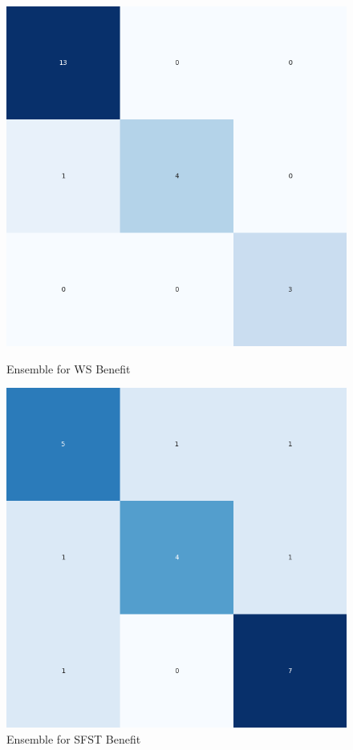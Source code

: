 \begin{figure}[H]
    \centering
    \begin{minipage}[b]{0.45\textwidth}
        \includegraphics[width=\textwidth]{./class_specificxtra_section/ensemble_plots/ensemble_confusion_matrix_WS_Benefit.png}
        \caption{Ensemble for WS Benefit}
        \label{fig_class:specxtra_ensemble_ws_benefit}
    \end{minipage}
    \hfill
    \begin{minipage}[b]{0.45\textwidth}
        \includegraphics[width=\textwidth]{./class_specificxtra_section/ensemble_plots/ensemble_confusion_matrix_SFST_Benefit.png}
        \caption{Ensemble for SFST Benefit}
        \label{fig_class:specxtra_ensemble_sfst_benefit}
    \end{minipage}
\end{figure}